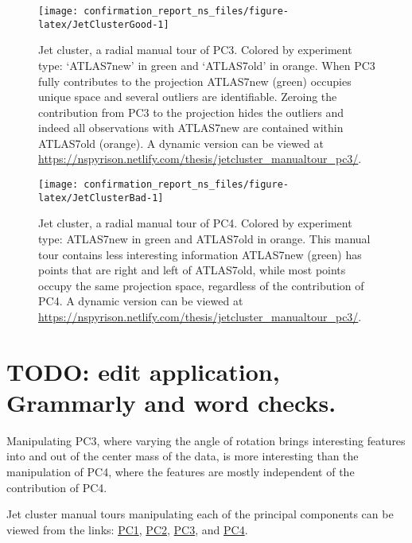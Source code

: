 \documentclass{monashthesis}
\begin{document}
\begin{figure}

{\centering \texttt{[image: confirmation\_report\_ns\_files/figure-latex/JetClusterGood-1]} 

}

\caption{Jet cluster, a radial manual tour of PC3.
Colored by experiment type: `ATLAS7new' in green and `ATLAS7old' in
orange. When PC3 fully contributes to the projection ATLAS7new (green)
occupies unique space and several outliers are identifiable. Zeroing the
contribution from PC3 to the projection hides the outliers and indeed
all observations with ATLAS7new are contained within ATLAS7old (orange).
A dynamic version can be viewed at
\url{https://nspyrison.netlify.com/thesis/jetcluster_manualtour_pc3/}.}\label{fig:JetClusterGood}
\end{figure}









\begin{figure}

{\centering \texttt{[image: confirmation\_report\_ns\_files/figure-latex/JetClusterBad-1]} 

}

\caption{Jet cluster, a radial manual tour of PC4.
Colored by experiment type: ATLAS7new in green and ATLAS7old in orange.
This manual tour contains less interesting information ATLAS7new (green)
has points that are right and left of ATLAS7old, while most points
occupy the same projection space, regardless of the contribution of PC4.
A dynamic version can be viewed at
\url{https://nspyrison.netlify.com/thesis/jetcluster_manualtour_pc3/}.}\label{fig:JetClusterBad}
\end{figure}

\section{TODO: edit application, Grammarly and word
checks.}\label{todo-edit-application-grammarly-and-word-checks.}

Manipulating PC3, where varying the angle of rotation brings interesting
features into and out of the center mass of the data, is more
interesting than the manipulation of PC4, where the features are mostly
independent of the contribution of PC4.

Jet cluster manual tours manipulating each of the principal components
can be viewed from the links:
\href{https://nspyrison.netlify.com/thesis/jetcluster_manualtour_pc1/}{PC1},
\href{https://nspyrison.netlify.com/thesis/jetcluster_manualtour_pc2/}{PC2},
\href{https://nspyrison.netlify.com/thesis/jetcluster_manualtour_pc3/}{PC3},
and
\href{https://nspyrison.netlify.com/thesis/jetcluster_manualtour_pc4/}{PC4}.
\end{document}

